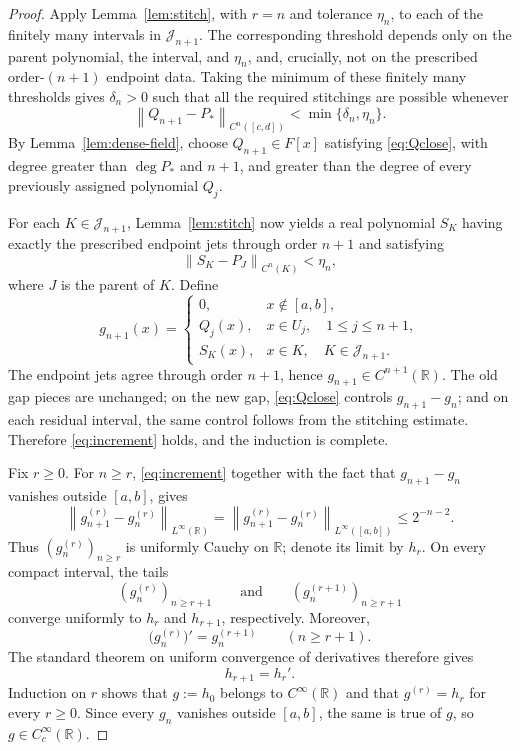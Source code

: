 \documentclass[11pt,reqno]{amsart}
\numberwithin{equation}{section}
\theoremstyle{definition}
\theoremstyle{remark}
\newcommand{\R}{\mathbb R}
\newcommand{\norm}[1]{\left\lVert #1\right\rVert}
\begin{document}
\begin{proof}
Apply Lemma~\ref{lem:stitch}, with $r=n$ and tolerance $\eta_n$, to each
of the finitely many intervals in $\mathcal J_{n+1}$. The corresponding
threshold depends only on the parent polynomial, the interval, and
$\eta_n$, and, crucially, not on the prescribed order-$(n+1)$ endpoint
data. Taking the minimum of these finitely many thresholds gives
$\delta_n>0$ such that all the required stitchings are possible whenever
\begin{equation}\label{eq:Qclose}
\norm{Q_{n+1}-P_*}_{C^n([c,d])}
<\min\{\delta_n,\eta_n\}.
\end{equation}
By Lemma~\ref{lem:dense-field}, choose $Q_{n+1}\in F[x]$ satisfying
\eqref{eq:Qclose}, with degree greater than $\deg P_*$ and $n+1$, and greater than the degree of every previously assigned polynomial $Q_j$.

For each $K\in\mathcal J_{n+1}$, Lemma~\ref{lem:stitch} now yields a real
polynomial $S_K$ having exactly the prescribed endpoint jets through order
$n+1$ and satisfying
\[
\norm{S_K-P_J}_{C^n(K)}<\eta_n,
\]
where $J$ is the parent of $K$. Define
\[
g_{n+1}(x)=
\begin{cases}
0, & x\notin[a,b],\\
Q_j(x), & x\in U_j,\quad 1\leq j\leq n+1,\\
S_K(x), & x\in K,\quad K\in\mathcal J_{n+1}.
\end{cases}
\]
The endpoint jets agree through order $n+1$, hence
$g_{n+1}\in C^{n+1}(\R)$. The old gap pieces are unchanged; on the new
gap, \eqref{eq:Qclose} controls $g_{n+1}-g_n$; and on each residual
interval, the same control follows from the stitching estimate. Therefore
\eqref{eq:increment} holds, and the induction is complete.



Fix $r\geq0$. For $n\geq r$, \eqref{eq:increment} together with the fact that $g_{n+1}-g_n$ vanishes outside $[a,b]$, gives
\[
\norm{g_{n+1}^{(r)}-g_n^{(r)}}_{L^\infty(\R)}=\norm{g_{n+1}^{(r)}-g_n^{(r)}}_{L^\infty([a,b])}
\leq2^{-n-2}.
\]
Thus $(g_n^{(r)})_{n\ge r}$ is uniformly Cauchy on $\mathbb R$; denote its limit by $h_r$. On every compact interval, the tails
\[
(g_n^{(r)})_{n\ge r+1}
\qquad\text{and}\qquad
(g_n^{(r+1)})_{n\ge r+1}
\]
converge uniformly to $h_r$ and $h_{r+1}$, respectively. Moreover,
\[
\bigl(g_n^{(r)}\bigr)'=g_n^{(r+1)}
\qquad (n\ge r+1).
\]
The standard theorem on uniform convergence of derivatives therefore gives
\[
h_{r+1}=h_r'.
\]
Induction on $r$ shows that $g:=h_0$ belongs to $C^\infty(\R)$ and that
$g^{(r)}=h_r$ for every $r\geq0$. Since every $g_n$ vanishes outside
$[a,b]$, the same is true of $g$, so $g\in C_c^\infty(\R)$.


\end{proof}
\end{document}
